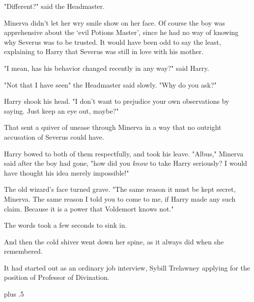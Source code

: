 "Different?" said the Headmaster.

Minerva didn't let her wry smile show on her face. Of course the boy was
apprehensive about the `evil Potions Master', since he had no way of knowing
why Severus was to be trusted. It would have been odd to say the least,
explaining to Harry that Severus was still in love with his mother.

"I mean, has his behavior changed recently in any way?" said Harry.

"Not that I have seen{\el}" the Headmaster said slowly. "Why do you ask?"

Harry shook his head. "I don't want to prejudice your own observations by
saying. Just keep an eye out, maybe?"

That sent a quiver of unease through Minerva in a way that no outright
accusation of Severus could have.

Harry bowed to both of them respectfully, and took his leave.
\sbreak
"Albus," Minerva said after the boy had gone, "how did you \emph{know} to take
Harry seriously? I would have thought his idea merely impossible!"

The old wizard's face turned grave. "The same reason it must be kept secret,
Minerva. The same reason I told you to come to me, if Harry made any such
claim. Because it is a power that Voldemort knows not."

The words took a few seconds to sink in.

And then the cold shiver went down her spine, as it always did when she
remembered.

It had started out as an ordinary job interview, Sybill Trelawney applying for
the position of Professor of Divination.

\begin{Spacing}{.97}
\begin{thought}[0pt]
\end{thought}
\end{Spacing}
\vskip 0pt plus .5\baselineskip\relax

